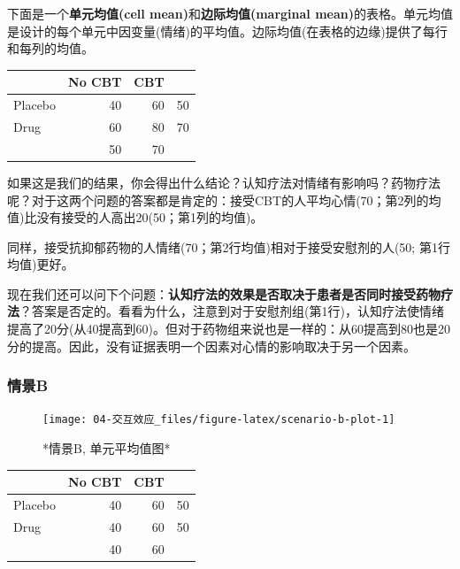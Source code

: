 \documentclass[
]{book}
\begin{document}
下面是一个\textbf{单元均值(cell mean)}和\textbf{边际均值(marginal mean)}的表格。单元均值是设计的每个单元中因变量(情绪)的平均值。边际均值(在表格的边缘)提供了每行和每列的均值。

\begin{table}
\centering
\begin{tabular}{l|r|r|l}
\hline
  & No CBT & CBT &   \\
\hline
Placebo & 40 & 60 & 50\\
\hline
Drug & 60 & 80 & 70\\
\hline
 & 50 & 70 & \\
\hline
\end{tabular}
\end{table}

如果这是我们的结果，你会得出什么结论？认知疗法对情绪有影响吗？药物疗法呢？对于这两个问题的答案都是肯定的：接受CBT的人平均心情(70；第2列的均值)比没有接受的人高出20(50；第1列的均值)。

同样，接受抗抑郁药物的人情绪(70；第2行均值)相对于接受安慰剂的人(50; 第1行均值)更好。

现在我们还可以问下个问题：\textbf{认知疗法的效果是否取决于患者是否同时接受药物疗法}？答案是否定的。看看为什么，注意到对于安慰剂组(第1行)，认知疗法使情绪提高了20分(从40提高到60)。但对于药物组来说也是一样的：从60提高到80也是20分的提高。因此，没有证据表明一个因素对心情的影响取决于另一个因素。

\hypertarget{ux60c5ux666fb}{%
\subsubsection*{情景B}\label{ux60c5ux666fb}}

\begin{figure}
\texttt{[image: 04-交互效应\_files/figure-latex/scenario-b-plot-1]} \caption{*情景B, 单元平均值图*}\label{fig:scenario-b-plot}
\end{figure}

\begin{table}
\centering
\begin{tabular}{l|r|r|l}
\hline
  & No CBT & CBT &   \\
\hline
Placebo & 40 & 60 & 50\\
\hline
Drug & 40 & 60 & 50\\
\hline
 & 40 & 60 & \\
\hline
\end{tabular}
\end{table}
\end{document}
